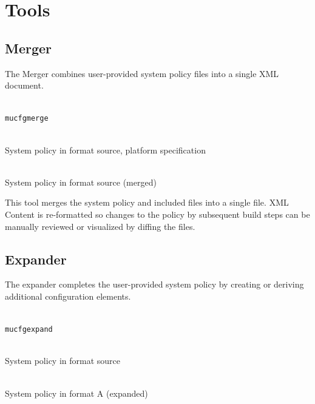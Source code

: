 \documentclass[a4paper,twoside,titlepage]{article}
\begin{document}
\section{Tools}
\label{sec:tools}

\subsection{Merger}
\label{sec:tools-merger}
The Merger combines user-provided system policy files into a single XML
document.

\begin{description} \itemsep1pt \parskip0pt
	\item[Name] \hfill \\
		\texttt{mucfgmerge}
	\item[Input] \hfill \\
		System policy in format source, platform specification
	\item[Output] \hfill \\
		System policy in format source (merged)
\end{description}

This tool merges the system policy and included files into a single file. XML
Content is re-formatted so changes to the policy by subsequent build steps can
be manually reviewed or visualized by diffing the files.

\subsection{Expander}
\label{sec:tools-expander}
The expander completes the user-provided system policy by creating or deriving
additional configuration elements.

\begin{description} \itemsep1pt \parskip0pt
	\item[Name] \hfill \\
		\texttt{mucfgexpand}
	\item[Input] \hfill \\
		System policy in format source
	\item[Output] \hfill \\
		System policy in format A (expanded)
\end{description}
\end{document}
